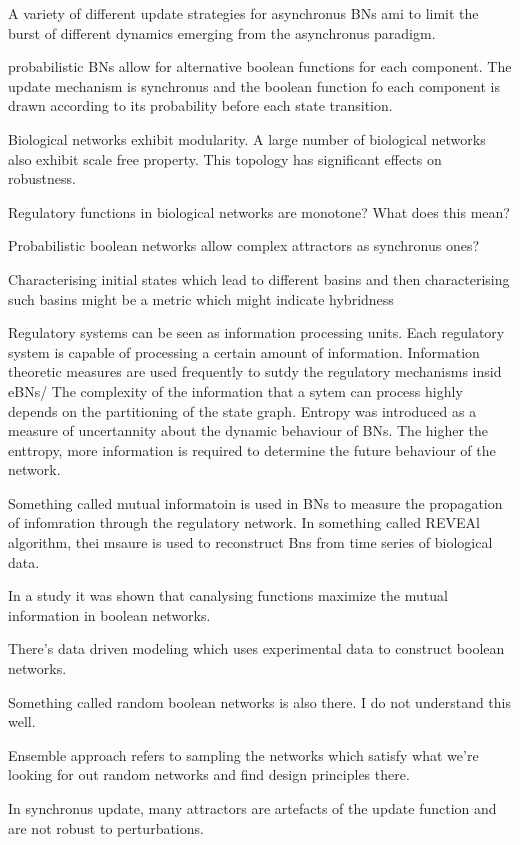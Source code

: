 \documentclass{article}
\begin{document}
A variety of different update strategies for asynchronus BNs ami to limit the burst of different dynamics emerging from the asynchronus paradigm. 

probabilistic BNs allow for alternative boolean functions for each component. The update mechanism is synchronus and the boolean function fo each component is drawn according to its probability before each state transition. 


Biological networks exhibit modularity. A large number of biological networks also exhibit scale free property. This topology has significant effects on robustness. 

Regulatory functions in biological networks are monotone? What does this mean?

Probabilistic boolean networks allow complex attractors as synchronus ones?

Characterising initial states which lead to different basins and then characterising such basins might be a metric which might indicate hybridness


Regulatory systems can be seen as information processing units. Each regulatory system is capable of processing a certain amount of information. Information theoretic measures are used frequently to sutdy the regulatory mechanisms insid eBNs/ The complexity of the information that a sytem can process highly depends on the partitioning of the state graph. Entropy was introduced as a measure of uncertannity about the dynamic behaviour of BNs. The higher the enttropy, more information is required to determine the future behaviour of the network. 

Something called mutual informatoin is used in BNs to measure the propagation of infomration through the regulatory network. In something called REVEAl algorithm, thei msaure is used to reconstruct Bns from time series of biological data. 

In a study it was shown that canalysing functions maximize the mutual information in boolean networks. 



There's data driven modeling which uses experimental data to construct boolean networks. 

Something called random boolean networks is also there. I do not understand this well. 


Ensemble approach refers to sampling the networks which satisfy what we're looking for out random networks and find design principles there. 

In synchronus update, many attractors are artefacts of the update function and are not robust to perturbations. 
\end{document}
